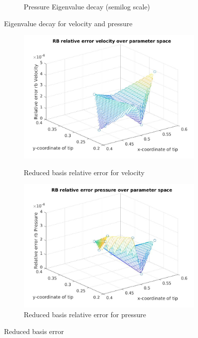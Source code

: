 \documentclass[a4paper,oneside,openright,spanish,english]{book}
\begin{document}
\begin{figure}
\begin{subfigure}{\textwidth}
  \caption{Pressure Eigenvalue decay (semilog scale)} 
  \label{eigen_value_decay_pressure_semilog}
\end{subfigure}
\caption{Eigenvalue decay for velocity and pressure}
\label{pod_eigenvalue_figure_semilog}
\end{figure}

\begin{figure}
\begin{subfigure}{\textwidth}	
  \includegraphics[width=\linewidth]{rb_error_velocity.jpg}
  \caption{Reduced basis relative error for velocity} 
  \label{rb_error_velocity}
  \includegraphics[width=\linewidth]{rb_error_pressure.jpg}
  \caption{Reduced basis relative error for pressure} 
  \label{rb_error_pressure}
\end{subfigure}
\caption{Reduced basis error}
\label{rb_error}
\end{figure}
\end{document}

